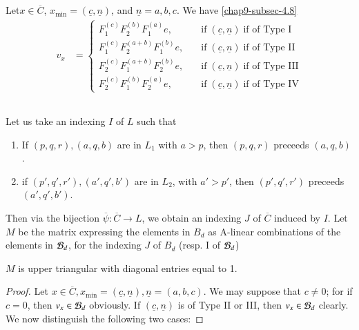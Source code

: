 \subsection{}\label{chap9-subsec-6.4}
Let\pageoriginale $x \in \overline{C}$, $x_{\min} = (\underline{c}, \underline{n})$, and $\underline{n}={a,b,c}$. We have \eqref{chap9-subsec-4.8}
\begin{align*}
v_{x} &=
\begin{cases}
F_{1}^{(c)}F_{2}^{(b)}F_{1}^{(a)}e, \quad & \text{if} \;(\underline{c}, \underline{n})\; \text{if of Type I}\\
F_{1}^{(c)}F_{2}^{(a+b)}F_{1}^{(b)}e, \quad & \text{if} \;(\underline{c}, \underline{n})\; \text{if of Type II}\\
F_{2}^{(c)}F_{1}^{(a+b)}F_{2}^{(b)}e, \quad & \text{if} \;(\underline{c}, \underline{n})\; \text{if of Type III}\\
F_{2}^{(c)}F_{1}^{(b)}F_{2}^{(a)}e, \quad & \text{if} \;(\underline{c}, \underline{n})\; \text{if of Type IV}
\end{cases}
\end{align*}

\subsection{}\label{chap9-subsec-6.5}
Let us take an indexing $I$ of $L$ such that
\begin{enumerate}[(1)]
\item If $(p,q,r), (a,q,b)$ are in $L_{1}$ with $a > p$, then $(p,q,r)$ preceeds $(a, q, b)$.\label{chap9-subsec6.5-enum-1}

\item if $(p',q',r'), (a',q', b')$ are in $L_{2}$, with $a' > p'$, then $(p',q',r')$
preceeds $(a',q', b')$. \label{chap9-subsec6.5-enum-2}
\end{enumerate}

Then via the bijection $\overline{\psi} : \overline{C} \longrightarrow L$, we obtain an indexing $J$ of $\overline{C}$ induced by $I$. Let $M$ be the matrix expressing the elements in $B_{d}$ as A-linear combinations of the elements in $\mathcal{B}_{d}$, for the indexing $J$ of $B_{d}$ (resp. I of $\mathcal{B}_{d}$)

\setcounter{definition}{5}
\begin{secthm}\label{chap9-thm-6.6}
$M$ is upper triangular with diagonal entries equal to 1.
\end{secthm}

\begin{proof}
Let $x \in \overline{C}, x_{\min} =(\underline{c}, \underline{n}), \underline{n} = (a,b,c)$. We may suppose that $c\neq 0$; for if $c = 0$, then $ v_{x} \in \mathcal{B}_{d}$ obviously. If $ (\underline{c}, \underline{n})$ is of Type II or III, then $v_{x} \in \mathcal{B}_{d}$ clearly. We now distinguish the following two cases:
\end{proof}


